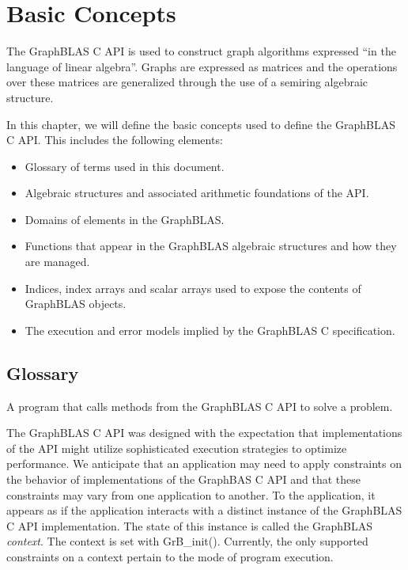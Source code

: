 \chapter{Basic Concepts}
\label{Chp:Concepts}

The GraphBLAS C API is used to construct  
graph algorithms expressed ``in the language of linear algebra''.
Graphs are expressed as matrices and the operations over 
these matrices are generalized through the use of a
semiring algebraic structure.

In this chapter, we will define the basic concepts used to
define the GraphBLAS C API.  This includes the following elements:
\begin{itemize}
\item Glossary of terms used in this document.  

\item Algebraic structures and associated arithmetic foundations of the API.

\item Domains of  elements in the GraphBLAS.  

\item Functions that appear in the GraphBLAS algebraic 
structures and how they are managed.

\item Indices, index arrays and scalar arrays used
to expose the contents of GraphBLAS objects.  

\item The execution and error models implied by the GraphBLAS C specification.

\end{itemize}

\section{Glossary}

\glossBegin

 A program that calls methods from the GraphBLAS C API to
solve a problem.

 The GraphBLAS C API was designed with the expectation that
implementations of the API might utilize sophisticated execution strategies 
to optimize performance.   We anticipate that an application may need 
to apply constraints on the behavior of implementations of the 
GraphBAS C API and that these constraints may vary from one application 
to another.   To the application, it appears as if the application 
interacts with a distinct instance of the GraphBLAS C API implementation.
The state of this instance is called the GraphBLAS \emph{context}. 
The context  is set with {\sf GrB\_init()}. Currently, the only
supported constraints on a context pertain to the mode of program execution.

